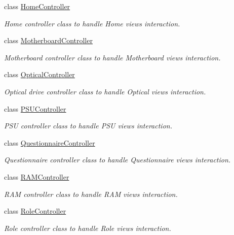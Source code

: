 \begin{DoxyCompactItemize}
class \hyperlink{class_p_c_builder_m_v_c_1_1_controllers_1_1_home_controller}{Home\+Controller}
\begin{DoxyCompactList}\small\item\em Home controller class to handle Home views interaction. \end{DoxyCompactList}\item 
class \hyperlink{class_p_c_builder_m_v_c_1_1_controllers_1_1_motherboard_controller}{Motherboard\+Controller}
\begin{DoxyCompactList}\small\item\em Motherboard controller class to handle Motherboard views interaction. \end{DoxyCompactList}\item 
class \hyperlink{class_p_c_builder_m_v_c_1_1_controllers_1_1_optical_controller}{Optical\+Controller}
\begin{DoxyCompactList}\small\item\em Optical drive controller class to handle Optical views interaction. \end{DoxyCompactList}\item 
class \hyperlink{class_p_c_builder_m_v_c_1_1_controllers_1_1_p_s_u_controller}{P\+S\+U\+Controller}
\begin{DoxyCompactList}\small\item\em P\+SU controller class to handle P\+SU views interaction. \end{DoxyCompactList}\item 
class \hyperlink{class_p_c_builder_m_v_c_1_1_controllers_1_1_questionnaire_controller}{Questionnaire\+Controller}
\begin{DoxyCompactList}\small\item\em Questionnaire controller class to handle Questionnaire views interaction. \end{DoxyCompactList}\item 
class \hyperlink{class_p_c_builder_m_v_c_1_1_controllers_1_1_r_a_m_controller}{R\+A\+M\+Controller}
\begin{DoxyCompactList}\small\item\em R\+AM controller class to handle R\+AM views interaction. \end{DoxyCompactList}\item 
class \hyperlink{class_p_c_builder_m_v_c_1_1_controllers_1_1_role_controller}{Role\+Controller}
\begin{DoxyCompactList}\small\item\em Role controller class to handle Role views interaction. \end{DoxyCompactList}\item 

\end{DoxyCompactItemize}
